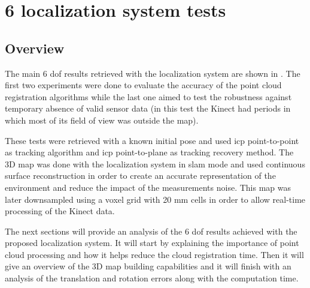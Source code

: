 \clearpage

\section{6  localization system tests}\label{sec:tridimensional-localization-system-tests}

\subsection{Overview}

The main 6 \gls{dof} results retrieved with the localization system are shown in . The first two experiments were done to evaluate the accuracy of the point cloud registration algorithms while the last one aimed to test the robustness against temporary absence of valid sensor data (in this test the Kinect had periods in which most of its field of view was outside the map).

These tests were retrieved with a known initial pose and used \gls{icp} point-to-point as tracking algorithm and \gls{icp} point-to-plane as tracking recovery method. The 3D map was done with the localization system in \gls{slam} mode and used continuous surface reconstruction in order to create an accurate representation of the environment and reduce the impact of the measurements noise. This map was later downsampled using a voxel grid with 20 mm cells in order to allow real-time processing of the Kinect data.

The next sections will provide an analysis of the 6 \gls{dof} results achieved with the proposed localization system. It will start by explaining the importance of point cloud processing and how it helps reduce the cloud registration time. Then it will give an overview of the 3D map building capabilities and it will finish with an analysis of the translation and rotation errors along with the computation time.


